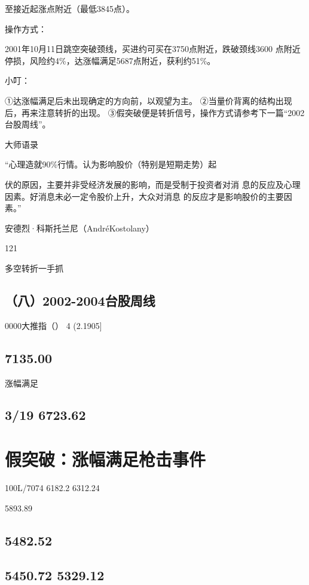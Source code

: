 \documentclass{article}
\begin{document}
至接近起涨点附近（最低3845点）。

操作方式：

2001年10月11日跳空突破颈线，买进约可买在3750点附近，跌破颈线3600 点附近停损，风险约4\%，达涨幅满足5687点附近，获利约51\%。

小叮：

①达涨幅满足后未出现确定的方向前，以观望为主。 ②当量价背离的结构出现后，再来注意转折的出现。 ③假突破便是转折信号，操作方式请参考下一篇“2002台股周线”。

大师语录

“心理造就90\%行情。认为影响股价（特别是短期走势）起

伏的原因，主要并非受经济发展的影响，而是受制于投资者对消 息的反应及心理因素。好消息未必一定令股价上升，大众对消息 的反应才是影响股价的主要因素。”

安德烈·科斯托兰尼（AndréKostolany）

121

\clearpage

多空转折一手抓

\subsection{（八）2002-2004台股周线}

0000大推指（） 4 (2.1905]

\subsection{7135.00}

涨幅满足

\subsection{3/19 6723.62}

\section{假突破：涨幅满足枪击事件}

100L/7074 6182.2 6312.24

5893.89

\subsection{5482.52}

\subsection{5450.72 5329.12}
\end{document}
